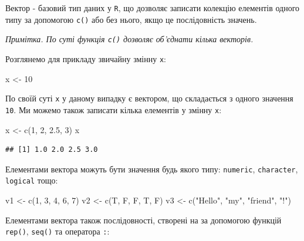 \documentclass[
]{book}
\newenvironment{Shaded}{\begin{snugshade}}{\end{snugshade}}
\newcommand{\DecValTok}[1]{\textcolor[rgb]{0.00,0.00,0.81}{#1}}
\newcommand{\FloatTok}[1]{\textcolor[rgb]{0.00,0.00,0.81}{#1}}
\newcommand{\FunctionTok}[1]{\textcolor[rgb]{0.00,0.00,0.00}{#1}}
\newcommand{\NormalTok}[1]{#1}
\newcommand{\OtherTok}[1]{\textcolor[rgb]{0.56,0.35,0.01}{#1}}
\newcommand{\StringTok}[1]{\textcolor[rgb]{0.31,0.60,0.02}{#1}}
\begin{document}
Вектор - базовий тип даних у \texttt{R}, що дозволяє записати колекцію елементів одного типу за допомогою \texttt{c()} або без нього, якщо це послідовність значень.

\emph{Примітка. По суті функція \texttt{c()} дозволяє об'єднати кілька векторів.}

Розглянемо для прикладу звичайну змінну \texttt{x}:

\begin{Shaded}
\begin{Highlighting}[]
\NormalTok{x }\OtherTok{\textless{}{-}} \DecValTok{10}
\end{Highlighting}
\end{Shaded}

По своїй суті \texttt{x} у даному випадку є вектором, що складається з одного значення \texttt{10}. Ми можемо також записати кілька елементів у змінну \texttt{x}:

\begin{Shaded}
\begin{Highlighting}[]
\NormalTok{x }\OtherTok{\textless{}{-}} \FunctionTok{c}\NormalTok{(}\DecValTok{1}\NormalTok{, }\DecValTok{2}\NormalTok{, }\FloatTok{2.5}\NormalTok{, }\DecValTok{3}\NormalTok{)}
\NormalTok{x}
\end{Highlighting}
\end{Shaded}

\begin{verbatim}
## [1] 1.0 2.0 2.5 3.0
\end{verbatim}

Елементами вектора можуть бути значення будь якого типу: \texttt{numeric}, \texttt{character}, \texttt{logical} тощо:

\begin{Shaded}
\begin{Highlighting}[]
\NormalTok{v1 }\OtherTok{\textless{}{-}} \FunctionTok{c}\NormalTok{(}\DecValTok{1}\NormalTok{, }\DecValTok{3}\NormalTok{, }\DecValTok{4}\NormalTok{, }\DecValTok{6}\NormalTok{, }\DecValTok{7}\NormalTok{)}
\NormalTok{v2 }\OtherTok{\textless{}{-}} \FunctionTok{c}\NormalTok{(T, F, F, T, F)}
\NormalTok{v3 }\OtherTok{\textless{}{-}} \FunctionTok{c}\NormalTok{(}\StringTok{"Hello"}\NormalTok{, }\StringTok{"my"}\NormalTok{, }\StringTok{"friend"}\NormalTok{, }\StringTok{"!"}\NormalTok{)}
\end{Highlighting}
\end{Shaded}

Елементами вектора також послідовності, створені на за допомогою функцій \texttt{rep()}, \texttt{seq()} та оператора \texttt{:}:
\end{document}
